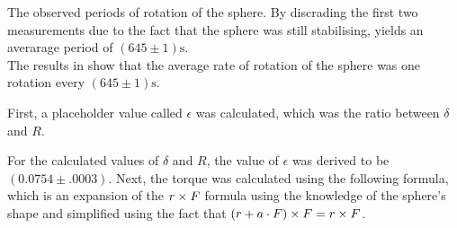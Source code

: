 \begin{paper}
{The observed periods of rotation of the sphere. By discrading the first two measurements due to the fact that the sphere was still stabilising, yields an averarage period of $(645\pm1)\si{\second}$.}\\

The results in \figT show that the average rate of rotation of the sphere was one rotation every $(645\pm1)\si{\second}$.


First, a placeholder value called $\epsilon$ was calculated, which was the ratio between $\delta$ and $R$.

\begin{paperwhere}
\end{paperwhere}

For the calculated values of $\delta$ and $R$, the value of $\epsilon$ was derived to be $(0.0754\pm.0003)$.
Next, the torque was calculated using the following formula, which is an expansion of the $r\times F$ formula using the knowledge of the sphere's shape and simplified using the fact that $(r+a\cdot F)\times F=r\times F$.


\end{paper}
